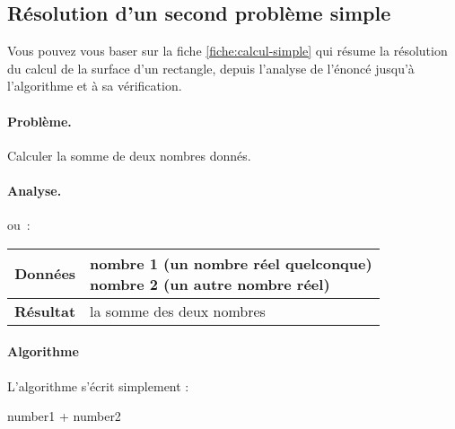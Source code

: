 		\subsection{Résolution d'un second problème simple}
		\label{prem-ex-simple}

			
			Vous pouvez vous baser sur la fiche \vref{fiche:calcul-simple} qui
			résume la résolution du calcul de la surface d’un rectangle, depuis
			l’analyse de l’énoncé jusqu’à l’algorithme et à sa vérification.
	
			\begin{Emphase}
				
				\paragraph{Problème.}
				Calculer la somme de deux nombres donnés.

				\paragraph{Analyse.}
				\begin{center}
				\end{center}

				ou~:

				\begin{center}
				\begin{tabular}[t]{|>{\columncolor{black!40}}r|l|}
				\hline
				\textbf{Données} & \makecell[tl]{
					nombre 1 (un nombre réel quelconque)\\
					nombre 2 (un autre nombre réel)
				}\\
				\hline
				\textbf{Résultat} & la somme des deux nombres\\
				\hline
				\end{tabular}
				\end{center}
				
				\paragraph{Algorithme}

				L’algorithme s’écrit simplement :			
				
				\begin{pseudocode}
						\Return number1 + number2
					\EndAlgo
				\end{pseudocode}


\end{Emphase}
